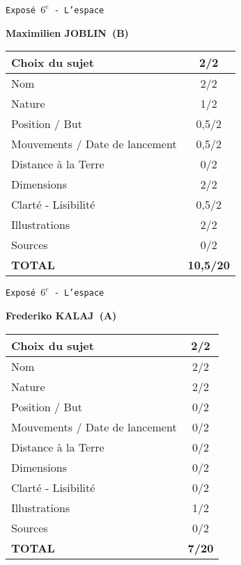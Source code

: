 	\vspace*{1cm}
	
	\newpage
	\LARGE{\texttt{Expos\'e $6^e$ - L'espace}}
	\vspace*{1cm}

	\textbf{Maximilien JOBLIN\ (B)}

	\vspace*{1.5cm}
	\begin{tabular}{|l|c|}
		\hline
		Choix du sujet & 2/2 \\
		\hline
		Nom & 2/2 \\
		\hline
		Nature & 1/2 \\
		\hline
		Position / But & 0,5/2 \\
		\hline
		Mouvements / Date de lancement & 0,5/2 \\
		\hline
		Distance \`a la Terre & 0/2 \\
		\hline
		Dimensions & 2/2 \\
		\hline
		Clart\'e - Lisibilit\'e & 0,5/2 \\
		\hline
		Illustrations & 2/2 \\
		\hline
		Sources & 0/2 \\
		\hline
		\textbf{TOTAL}  & \textbf{10,5/20} \\
		\hline
	\end{tabular}

	\vspace*{1cm}
	
	\newpage
	\LARGE{\texttt{Expos\'e $6^e$ - L'espace}}
	\vspace*{1cm}

	\textbf{Frederiko KALAJ\ (A)}

	\vspace*{1.5cm}
	\begin{tabular}{|l|c|}
		\hline
		Choix du sujet & 2/2 \\
		\hline
		Nom & 2/2 \\
		\hline
		Nature & 2/2 \\
		\hline
		Position / But & 0/2 \\
		\hline
		Mouvements / Date de lancement & 0/2 \\
		\hline
		Distance \`a la Terre & 0/2 \\
		\hline
		Dimensions & 0/2 \\
		\hline
		Clart\'e - Lisibilit\'e & 0/2 \\
		\hline
		Illustrations & 1/2 \\
		\hline
		Sources & 0/2 \\
		\hline
		\textbf{TOTAL}  & \textbf{7/20} \\
		\hline
	\end{tabular}

